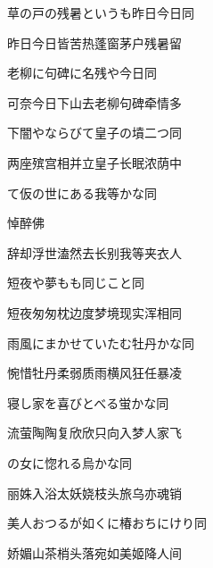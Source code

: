 \begin{haiku}
    {\FH 草の戸の残暑というも昨日今日}\hfill{\FH 同}

    {\FK 昨日今日皆苦热蓬窗茅户残暑留}
\end{haiku}

\begin{haiku}
    {\FH 老柳に句碑に名残や今日}\hfill{\FH 同}

    {\FK 可奈今日下山去老柳句碑牵情多}
\end{haiku}

\begin{haiku}
    {\FH 下闇やならびて皇子の墳二つ}\hfill{\FH 同}

    {\FK 两座殡宫相并立皇子长眠浓荫中}
\end{haiku}

\begin{haiku}
    {\FH {}て仮の世にある我等かな}\hfill{\FH 同}

    {\FK 悼醉佛}

    {\FK 辞却浮世溘然去长别我等夹衣人}
\end{haiku}

\begin{haiku}
    {\FH 短夜や夢もも同じこと}\hfill{\FH 同}

    {\FK 短夜匆匆枕边度梦境现实浑相同}
\end{haiku}

\begin{haiku}
    {\FH 雨風にまかせていたむ牡丹かな}\hfill{\FH 同}

    {\FK 惋惜牡丹柔弱质雨横风狂任暴凌}
\end{haiku}

\begin{haiku}
    {\FH 寝し家を喜びとべる蛍かな}\hfill{\FH 同}

    {\FK 流萤陶陶复欣欣只向入梦人家飞}
\end{haiku}

\begin{haiku}
    {\FH {}の女に惚れる烏かな}\hfill{\FH 同}

    {\FK 丽姝入浴太妖娆枝头旅乌亦魂销}
\end{haiku}

\begin{haiku}
    {\FH 美人おつるが如くに椿おちにけり}\hfill{\FH 同}

    {\FK 娇媚山茶梢头落宛如美姬降人间}
\end{haiku}

